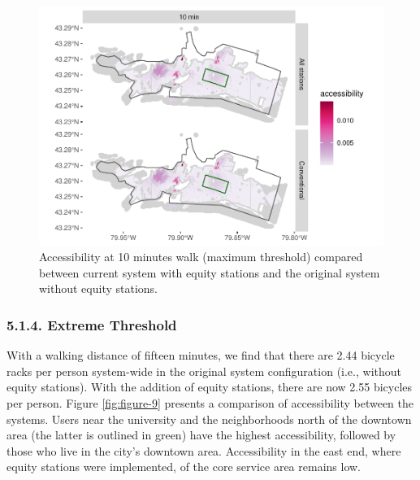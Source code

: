 \documentclass[]{elsarticle} %
\begin{document}
\begin{figure}

{\centering \includegraphics[width=0.9\linewidth]{Bike-share-spatial-equity_files/figure-latex/figure-8-1} 

}

\caption{Accessibility at 10 minutes walk (maximum threshold) compared between current system with equity stations and the original system without equity stations.}\label{fig:figure-8}
\end{figure}

\hypertarget{extreme-threshold}{%
\subsubsection{5.1.4. Extreme Threshold}\label{extreme-threshold}}

With a walking distance of fifteen minutes, we find that there are 2.44
bicycle racks per person system-wide in the original system
configuration (i.e., without equity stations). With the addition of
equity stations, there are now 2.55 bicycles per person. Figure
\ref{fig:figure-9} presents a comparison of accessibility between the
systems. Users near the university and the neighborhoods north of the
downtown area (the latter is outlined in green) have the highest
accessibility, followed by those who live in the city's downtown area.
Accessibility in the east end, where equity stations were implemented,
of the core service area remains low.
\end{document}
